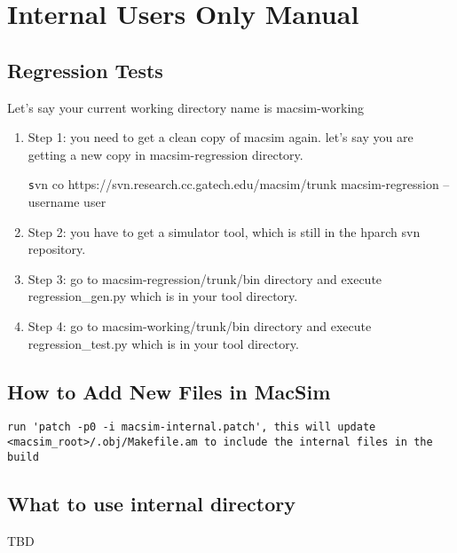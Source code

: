 
\chapter{Internal Users Only Manual}
\section{Regression Tests}
\label{sec:regression}

Let's say your current working directory name is macsim-working

\begin{enumerate}

\item Step 1: you need to get a clean copy of macsim again. let's say you are getting a new copy in macsim-regression directory.

{\texttt svn co https://svn.research.cc.gatech.edu/macsim/trunk macsim-regression --username user }

\item Step 2: you have to get a simulator tool, which is still in the hparch svn repository.

\item Step 3: go to macsim-regression/trunk/bin directory and execute regression\_gen.py which is in your tool directory.

\item Step 4: go to macsim-working/trunk/bin directory and execute regression\_test.py which is in your tool directory. 

\end{enumerate}


\section{How to Add New Files in MacSim}

\begin{Verbatim} 
run 'patch -p0 -i macsim-internal.patch', this will update <macsim_root>/.obj/Makefile.am to include the internal files in the build 
\end{Verbatim}


\section{What to use internal directory}

TBD


